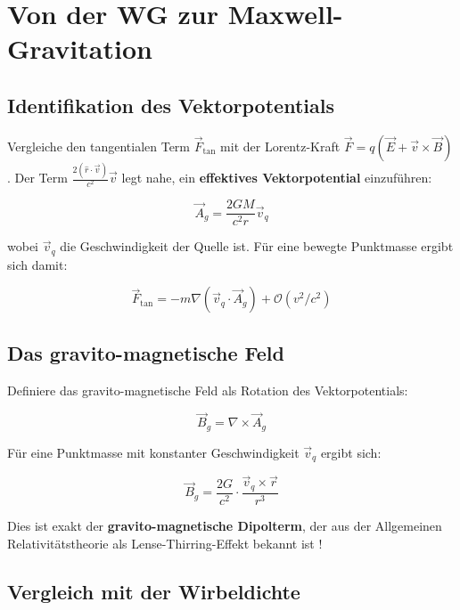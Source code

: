 \documentclass[12pt,a4paper]{article}
\begin{document}
\section{Von der WG zur Maxwell-Gravitation}

\subsection{Identifikation des Vektorpotentials}

Vergleiche den tangentialen Term \(\vec{F}_{\text{tan}}\) mit der Lorentz-Kraft \(\vec{F} = q(\vec{E} + \vec{v} \times \vec{B})\). Der Term \(\frac{2(\hat{r}\cdot\vec{v})}{c^2}\vec{v}\) legt nahe, ein \textbf{effektives Vektorpotential} einzuführen:

\begin{equation}
\vec{A}_g = \frac{2GM}{c^2 r} \vec{v}_q
\label{eq:vector_potential}
\end{equation}

wobei \(\vec{v}_q\) die Geschwindigkeit der Quelle ist. Für eine bewegte Punktmasse ergibt sich damit:

\begin{equation}
\vec{F}_{\text{tan}} = -m \nabla (\vec{v}_q \cdot \vec{A}_g) + \mathcal{O}(v^2/c^2)
\end{equation}

\subsection{Das gravito-magnetische Feld}

Definiere das gravito-magnetische Feld als Rotation des Vektorpotentials:

\begin{equation}
\vec{B}_g = \nabla \times \vec{A}_g
\label{eq:Bg}
\end{equation}

Für eine Punktmasse mit konstanter Geschwindigkeit \(\vec{v}_q\) ergibt sich:

\begin{equation}
\vec{B}_g = \frac{2G}{c^2} \cdot \frac{\vec{v}_q \times \vec{r}}{r^3}
\label{eq:Bg_point}
\end{equation}

Dies ist exakt der \textbf{gravito-magnetische Dipolterm}, der aus der Allgemeinen Relativitätstheorie als Lense-Thirring-Effekt bekannt ist \cite{thirring1918, lense1918}!

\subsection{Vergleich mit der Wirbeldichte}
\end{document}
